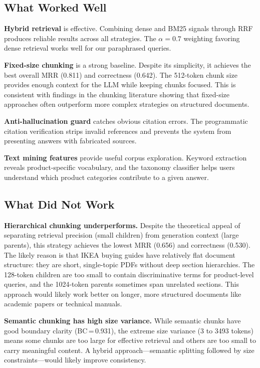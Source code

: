 \documentclass[conference]{IEEEtran}
\begin{document}
\subsection{What Worked Well}

\textbf{Hybrid retrieval} is effective. Combining dense and BM25 signals through RRF produces reliable results across all strategies. The $\alpha=0.7$ weighting favoring dense retrieval works well for our paraphrased queries.

\textbf{Fixed-size chunking} is a strong baseline. Despite its simplicity, it achieves the best overall MRR (0.811) and correctness (0.642). The 512-token chunk size provides enough context for the LLM while keeping chunks focused. This is consistent with findings in the chunking literature showing that fixed-size approaches often outperform more complex strategies on structured documents.

\textbf{Anti-hallucination guard} catches obvious citation errors. The programmatic citation verification strips invalid references and prevents the system from presenting answers with fabricated sources.

\textbf{Text mining features} provide useful corpus exploration. Keyword extraction reveals product-specific vocabulary, and the taxonomy classifier helps users understand which product categories contribute to a given answer.

\subsection{What Did Not Work}

\textbf{Hierarchical chunking underperforms.} Despite the theoretical appeal of separating retrieval precision (small children) from generation context (large parents), this strategy achieves the lowest MRR (0.656) and correctness (0.530). The likely reason is that IKEA buying guides have relatively flat document structure: they are short, single-topic PDFs without deep section hierarchies. The 128-token children are too small to contain discriminative terms for product-level queries, and the 1024-token parents sometimes span unrelated sections. This approach would likely work better on longer, more structured documents like academic papers or technical manuals.

\textbf{Semantic chunking has high size variance.} While semantic chunks have good boundary clarity (BC\,=\,0.931), the extreme size variance (3 to 3493 tokens) means some chunks are too large for effective retrieval and others are too small to carry meaningful content. A hybrid approach---semantic splitting followed by size constraints---would likely improve consistency.
\end{document}
